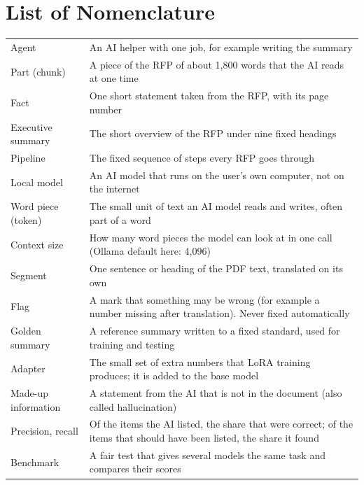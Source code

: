 \documentclass[11pt,a4paper,oneside]{report}
\newcommand{\tocline}[3]{\par\noindent{#1#2}\cftdotfill{\cftdotsep}{#1#3}\par\vspace{2pt}}
\newcommand{\addtocline}[2]{\addtocontents{toc}{\protect\tocline{#1}{#2}{\thepage}}}
\begin{document}
\chapter*{List of Nomenclature}
\addtocline{\itshape}{List of Nomenclature}
\begin{tabular}{@{}p{3.6cm}p{11.8cm}@{}}
Agent & An AI helper with one job, for example writing the summary\\[2pt]
Part (chunk) & A piece of the RFP of about 1,800 words that the AI reads at one time\\[2pt]
Fact & One short statement taken from the RFP, with its page number\\[2pt]
Executive summary & The short overview of the RFP under nine fixed headings\\[2pt]
Pipeline & The fixed sequence of steps every RFP goes through\\[2pt]
Local model & An AI model that runs on the user's own computer, not on the internet\\[2pt]
Word piece (token) & The small unit of text an AI model reads and writes, often part of a word\\[2pt]
Context size & How many word pieces the model can look at in one call (Ollama default here: 4,096)\\[2pt]
Segment & One sentence or heading of the PDF text, translated on its own\\[2pt]
Flag & A mark that something may be wrong (for example a number missing after translation). Never fixed automatically\\[2pt]
Golden summary & A reference summary written to a fixed standard, used for training and testing\\[2pt]
Adapter & The small set of extra numbers that LoRA training produces; it is added to the base model\\[2pt]
Made-up information & A statement from the AI that is not in the document (also called hallucination)\\[2pt]
Precision, recall & Of the items the AI listed, the share that were correct; of the items that should have been listed, the share it found\\[2pt]
Benchmark & A fair test that gives several models the same task and compares their scores\\
\end{tabular}

\cleardoublepage
{}
\end{document}
